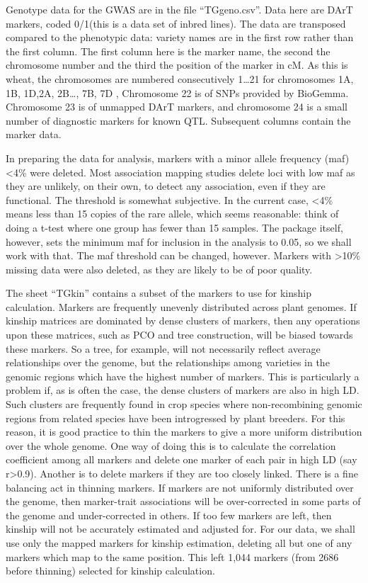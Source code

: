 \documentclass[
]{book}
\begin{document}
Genotype data for the GWAS are in the file ``TGgeno.csv''. Data here are DArT markers, coded 0/1(this is a data set of inbred lines). The data are transposed compared to the phenotypic data: variety names are in the first row rather than the first column. The first column here is the marker name, the second the chromosome number and the third the position of the marker in cM. As this is wheat, the chromosomes are numbered consecutively 1\ldots21 for chromosomes 1A, 1B, 1D,2A, 2B\ldots, 7B, 7D , Chromosome 22 is of SNPs provided by BioGemma. Chromosome 23 is of unmapped DArT markers, and chromosome 24 is a small number of diagnostic markers for known QTL. Subsequent columns contain the marker data.

In preparing the data for analysis, markers with a minor allele frequency (maf) \textless4\% were deleted. Most association mapping studies delete loci with low maf as they are unlikely, on their own, to detect any association, even if they are functional. The threshold is somewhat subjective. In the current case, \textless4\% means less than 15 copies of the rare allele, which seems reasonable: think of doing a t-test where one group has fewer than 15 samples. The package itself, however, sets the minimum maf for inclusion in the analysis to 0.05, so we shall work with that. The maf threshold can be changed, however. Markers with \textgreater10\% missing data were also deleted, as they are likely to be of poor quality.

The sheet ``TGkin'' contains a subset of the markers to use for kinship calculation. Markers are frequently unevenly distributed across plant genomes. If kinship matrices are dominated by dense clusters of markers, then any operations upon these matrices, such as PCO and tree construction, will be biased towards these markers. So a tree, for example, will not necessarily reflect average relationships over the genome, but the relationships among varieties in the genomic regions which have the highest number of markers. This is particularly a problem if, as is often the case, the dense clusters of markers are also in high LD. Such clusters are frequently found in crop species where non-recombining genomic regions from related species have been introgressed by plant breeders. For this reason, it is good practice to thin the markers to give a more uniform distribution over the whole genome. One way of doing this is to calculate the correlation coefficient among all markers and delete one marker of each pair in high LD (say r\textgreater0.9). Another is to delete markers if they are too closely linked. There is a fine balancing act in thinning markers. If markers are not uniformly distributed over the genome, then marker-trait associations will be over-corrected in some parts of the genome and under-corrected in others. If too few markers are left, then kinship will not be accurately estimated and adjusted for. For our data, we shall use only the mapped markers for kinship estimation, deleting all but one of any markers which map to the same position. This left 1,044 markers (from 2686 before thinning) selected for kinship calculation.
\end{document}
